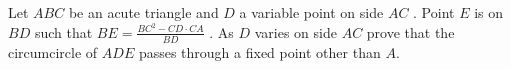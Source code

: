 Let $ABC$ be an acute triangle and $D$ a variable point on side $AC$ . Point $E$ is on $BD$ such that $BE =\frac{BC^2-CD\cdot CA}{BD}$ . As $D$ varies on side $AC$ prove that the circumcircle of $ADE$ passes through a fixed point other than $A$.